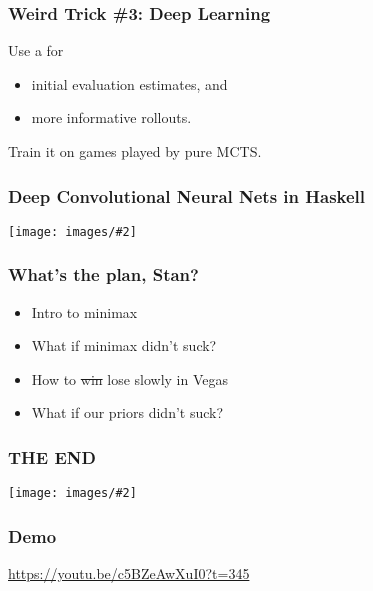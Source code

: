 \documentclass[table]{beamer}
\newcommand\img[2]{\texttt{[image: images/\#2]}}
\begin{document}
\begin{frame}
	\frametitle{Weird Trick \#3: Deep Learning}
	Use a \alert{}\footnotemark{} for
	
	\vspace{1.5ex}

	\begin{itemize}
		\setlength\itemsep{1.5ex}
		\item initial evaluation estimates, and
		\item more informative rollouts.
	\end{itemize}

	\vspace{1.5ex}

	Train it on games played by pure MCTS.

\end{frame}

\begin{frame}
    \frametitle{Deep Convolutional Neural Nets in Haskell}
    \begin{center}
        \img{1}{todo.png}
    \end{center}
\end{frame}

\begin{frame}
	\frametitle{What's the plan, Stan?}
	\begin{itemize}
		\setlength\itemsep{5ex}
		\item Intro to minimax
		\item What if minimax didn't suck?
		\item How to \sout{win} lose slowly in Vegas
		\item What if our priors didn't suck?
	\end{itemize}
\end{frame}

\begin{frame}
	\frametitle{THE END}
	\begin{center}
		\img{0.8}{questions.jpg}
	\end{center}
\end{frame}

\begin{frame}
	\frametitle{Demo}
	\url{https://youtu.be/c5BZeAwXuI0?t=345}
	\addtocounter{framenumber}{-1}
\end{frame}
\end{document}
